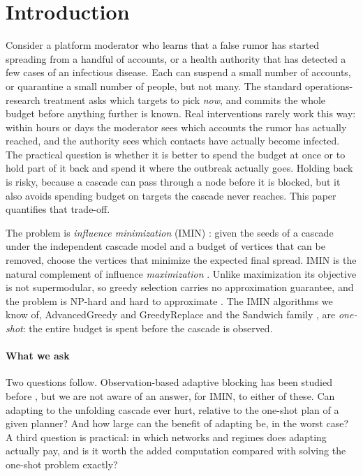 \documentclass[preprint,11pt]{elsarticle}
\theoremstyle{definition}
\theoremstyle{remark}
\begin{document}
\section{Introduction}\label{sec:intro}

Consider a platform moderator who learns that a false rumor has started spreading from a handful of accounts, or a health authority that has detected a few cases of an infectious disease. Each can suspend a small number of accounts, or quarantine a small number of people, but not many. The standard operations-research treatment asks which targets to pick \emph{now}, and commits the whole budget before anything further is known. Real interventions rarely work this way: within hours or days the moderator sees which accounts the rumor has actually reached, and the authority sees which contacts have actually become infected. The practical question is whether it is better to spend the budget at once or to hold part of it back and spend it where the outbreak actually goes. Holding back is risky, because a cascade can pass through a node before it is blocked, but it also avoids spending budget on targets the cascade never reaches. This paper quantifies that trade-off.

The problem is \emph{influence minimization} (IMIN) \citep{xie2023,xie2024}: given the seeds of a cascade under the independent cascade model and a budget of vertices that can be removed, choose the vertices that minimize the expected final spread. IMIN is the natural complement of influence \emph{maximization} \citep{kempe2003}. Unlike maximization its objective is not supermodular, so greedy selection carries no approximation guarantee, and the problem is NP-hard and hard to approximate \citep{xie2023}. The IMIN algorithms we know of, AdvancedGreedy and GreedyReplace \citep{xie2023,xie2024} and the Sandwich family \citep{wang2024sandwich}, are \emph{one-shot}: the entire budget is spent before the cascade is observed.

\paragraph{What we ask} Two questions follow. Observation-based adaptive blocking has been studied before \citep{shi2019}, but we are not aware of an answer, for IMIN, to either of these. Can adapting to the unfolding cascade ever hurt, relative to the one-shot plan of a given planner? And how large can the benefit of adapting be, in the worst case? A third question is practical: in which networks and regimes does adapting actually pay, and is it worth the added computation compared with solving the one-shot problem exactly?
\end{document}
